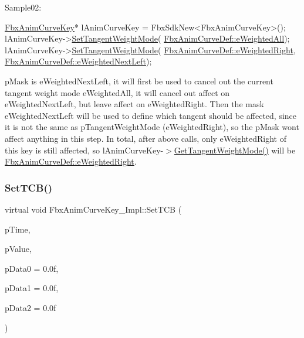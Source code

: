 Sample02\+: 
\begin{DoxyCode}
\hyperlink{class_fbx_anim_curve_key}{FbxAnimCurveKey}* lAnimCurveKey = FbxSdkNew<FbxAnimCurveKey>();
lAnimCurveKey->\hyperlink{class_fbx_anim_curve_key_a418159da0643ccdbeb5aa59b69b821e0}{SetTangentWeightMode}(
      \hyperlink{class_fbx_anim_curve_def_aeee6e9cc12501e10dbd3e5caaf66990ea4337e6853fab642c2a432ab1bb303922}{FbxAnimCurveDef::eWeightedAll});
lAnimCurveKey->\hyperlink{class_fbx_anim_curve_key_a418159da0643ccdbeb5aa59b69b821e0}{SetTangentWeightMode}(
      \hyperlink{class_fbx_anim_curve_def_aeee6e9cc12501e10dbd3e5caaf66990ea869960737022db21fc64480daa22725a}{FbxAnimCurveDef::eWeightedRight}, 
      \hyperlink{class_fbx_anim_curve_def_aeee6e9cc12501e10dbd3e5caaf66990eae28d75f955feebe5756d77ad0765d000}{FbxAnimCurveDef::eWeightedNextLeft});
\end{DoxyCode}
 p\+Mask is e\+Weighted\+Next\+Left, it will first be used to cancel out the current tangent weight mode e\+Weighted\+All, it will cancel out affect on e\+Weighted\+Next\+Left, but leave affect on e\+Weighted\+Right. Then the mask e\+Weighted\+Next\+Left will be used to define which tangent should be affected, since it is not the same as p\+Tangent\+Weight\+Mode (e\+Weighted\+Right), so the p\+Mask won\textquotesingle{}t affect anything in this step. In total, after above calls, only e\+Weighted\+Right of this key is still affected, so l\+Anim\+Curve\+Key-\/$>$\hyperlink{class_fbx_anim_curve_key___impl_a78b901f289d94aafab0b8256c2a865e2}{Get\+Tangent\+Weight\+Mode()} will be \hyperlink{class_fbx_anim_curve_def_aeee6e9cc12501e10dbd3e5caaf66990ea869960737022db21fc64480daa22725a}{Fbx\+Anim\+Curve\+Def\+::e\+Weighted\+Right}. \mbox{\label{class_fbx_anim_curve_key___impl_a7aa6e95254beb6c1bc43495629e766e1}} 
\subsubsection{\texorpdfstring{Set\+T\+C\+B()}{SetTCB()}}
{\footnotesize\ttfamily virtual void Fbx\+Anim\+Curve\+Key\+\_\+\+Impl\+::\+Set\+T\+CB (\begin{DoxyParamCaption}\item[{\hyperlink{class_fbx_time}{Fbx\+Time}}]{p\+Time,  }\item[{float}]{p\+Value,  }\item[{float}]{p\+Data0 = {\ttfamily 0.0f},  }\item[{float}]{p\+Data1 = {\ttfamily 0.0f},  }\item[{float}]{p\+Data2 = {\ttfamily 0.0f} }\end{DoxyParamCaption})\hspace{0.3cm}{\ttfamily [pure virtual]}}

